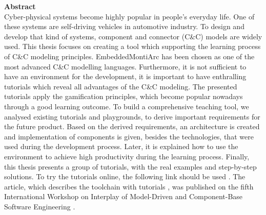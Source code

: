 \vspace*{2cm}

\vspace{10ex}
{\bf\Large Abstract} \\ [1em]
Cyber-physical systems become highly popular in people's everyday life. One of these systems are self-driving vehicles in automotive industry. To design and develop that kind of systems, component and connector (C\&C) models are widely used. This thesis focuses on creating a tool which supporting the learning process of C\&C modeling principles. EmbeddedMontiArc has been chosen as one of the most advanced C\&C modelling languages. Furthermore, it is not sufficient to have an environment for the development, it is important to have enthralling tutorials which reveal all advantages of the C\&C modeling. The presented tutorials apply the gamification principles, which become popular nowadays through a good learning outcome. To build a comprehensive teaching tool, we analysed existing tutorials and playgrounds, to derive important requirements for the future product. Based on the derived requirements, an architecture is created and implementation of components is given, besides the technologies, that were used during the development process. Later, it is explained how to use the environment to achieve high productivity during the learning process. Finally, this thesis presents a group of tutorials, with the real examples and step-by-step solutions. To try the tutorials online, the following link should be used \cite{OnlineExample}. The article, which describes the toolchain with tutorials \cite{TeachPlay}, was published on the fifth International Workshop on Interplay of Model-Driven and Component-Base Software Engineering \cite{ModComp18}.